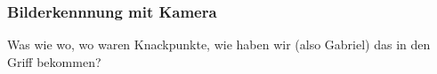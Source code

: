 \documentclass[main.tex]{subfiles} %
\begin{document}

\subsubsection{Bilderkennnung mit Kamera}

Was wie wo, wo waren Knackpunkte, wie haben wir (also Gabriel) das in den Griff
bekommen?
\end{document}

